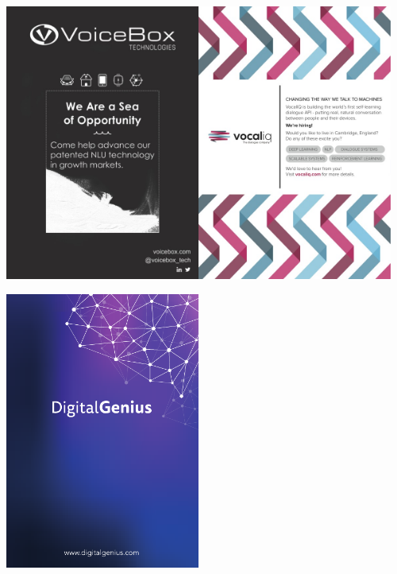 \vfill{}


\begin{center}
\includegraphics[width=0.48\textwidth]{content/images-web/ads/voicebox}\hfill{}\includegraphics[width=0.48\textwidth]{content/images-web/ads/vocaliq}
\par\end{center}

\vfill{}


\begin{center}
\includegraphics[width=0.48\textwidth]{content/images-web/ads/digitalgenius}
\par\end{center}


